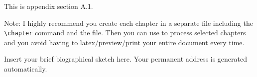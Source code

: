 \documentclass[11pt]{afthesis}
\begin{document}
	This is appendix section A.1.
	
	Note: I highly recommend you create each chapter in a separate file
	including the \verb|\chapter| command and \verb|| the file.
	Then you can use \verb|| to process selected chapters and
	you avoid having to latex/preview/print your entire document every
	time.
	
	
	
	
	
	
	\begin{vita}
		Insert your brief biographical sketch here. Your permanent
		address is generated automatically.
	\end{vita}
	
	
\end{document}

